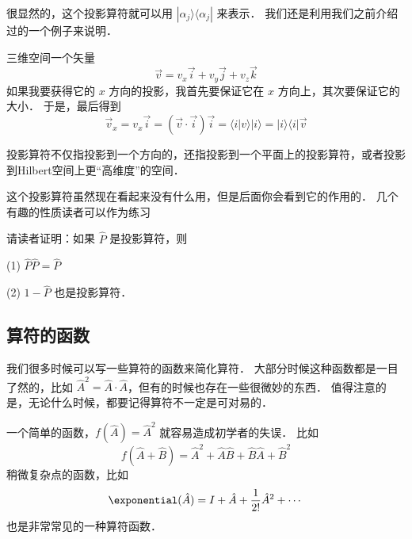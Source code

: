 很显然的，这个投影算符就可以用 $|\alpha_j\rangle\langle\alpha_j|$ 来表示． 我们还是利用我们之前介绍过的一个例子来说明．

\begin{exam}{}
三维空间一个矢量
\begin{equation}
\vec{v} = v_x\vec{i} + v_y\vec{j} + v_z \vec{k}
\end{equation}
如果我要获得它的 $x$ 方向的投影，我首先要保证它在 $x$ 方向上，其次要保证它的大小． 于是，最后得到
\begin{equation}
\vec{v}_x = v_x\vec{i} = (\vec{v}\cdot\vec{i})\vec{i} = \langle i|v\rangle |i\rangle = |i\rangle\langle i| \vec{v}
\end{equation}
\end{exam}

投影算符不仅指投影到一个方向的，还指投影到一个平面上的投影算符，或者投影到Hilbert空间上更“高维度”的空间．

这个投影算符虽然现在看起来没有什么用，但是后面你会看到它的作用的． 几个有趣的性质读者可以作为练习

\begin{exer}{}
请读者证明：如果 $\hat{P}$ 是投影算符，则

(1) $\hat{P}\hat{P} = \hat{P}$

(2) $1-\hat{P}$ 也是投影算符．
\end{exer}{}

\subsection{算符的函数}

我们很多时候可以写一些算符的函数来简化算符． 大部分时候这种函数都是一目了然的，比如 $\hat{A}^2 = \hat{A}\cdot\hat{A}$，但有的时候也存在一些很微妙的东西． 值得注意的是，无论什么时候，都要记得算符不一定是可对易的．

一个简单的函数，$f(\hat{A}) = \hat{A}^2$ 就容易造成初学者的失误． 比如
\begin{equation}
f(\hat{A}+\hat{B}) = \hat{A}^2 + \hat{A}\hat{B} + \hat{B}\hat{A} + \hat{B}^2
\end{equation}
稍微复杂点的函数，比如
\begin{equation}
\exponential(\hat{A}) = I + \hat{A} + \frac{1}{2!}\hat{A}^2 + \cdots
\end{equation}
也是非常常见的一种算符函数．


